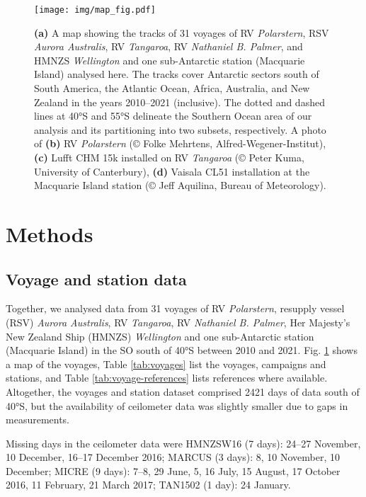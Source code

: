 \documentclass[12pt,a4paper]{article}
\begin{document}
\begin{figure}[b!]
\centering
\texttt{[image: img/map\_fig.pdf]}
\caption{
\textbf{(a)} A map showing the tracks of 31 voyages of RV \emph{Polarstern},
RSV \emph{Aurora Australis}, RV \emph{Tangaroa}, RV \emph{Nathaniel B. Palmer},
and HMNZS \emph{Wellington} and one sub-Antarctic station (Macquarie Island)
analysed here. The tracks cover Antarctic sectors south of South America, the
Atlantic Ocean, Africa, Australia, and New Zealand in the years 2010--2021
(inclusive).  The dotted and dashed lines at 40°S and 55°S delineate the
Southern Ocean area of our analysis and its partitioning into two subsets,
respectively.  A photo of \textbf{(b)} RV \emph{Polarstern} (© Folke Mehrtens,
Alfred-Wegener-Institut), \textbf{(c)} Lufft CHM 15k installed on RV
\emph{Tangaroa} (© Peter Kuma, University of Canterbury), \textbf{(d)} Vaisala
CL51 installation at the Macquarie Island station (© Jeff Aquilina, Bureau of
Meteorology).
}
\label{fig:map}
\end{figure}

\section{Methods}
\label{sec:methods}

\subsection{Voyage and station data}

Together, we analysed data from 31 voyages of RV \emph{Polarstern}, resupply
vessel (RSV) \emph{Aurora Australis}, RV \emph{Tangaroa}, RV \emph{Nathaniel B.
Palmer}, Her Majesty's New Zealand Ship (HMNZS) \emph{Wellington} and one
sub-Antarctic station (Macquarie Island) in the SO south of 40°S between 2010
and 2021. Fig. \ref{fig:map} shows a map of the voyages, Table
\ref{tab:voyages} list the voyages, campaigns and stations, and Table
\ref{tab:voyage-references} lists references where available. Altogether, the
voyages and station dataset comprised 2421 days of data south of 40°S, but the
availability of ceilometer data was slightly smaller due to gaps in
measurements.

Missing days in the ceilometer data were HMNZSW16 (7 days): 24--27 November, 10
December, 16--17 December 2016; MARCUS (3 days): 8, 10 November, 10 December;
MICRE (9 days): 7--8, 29 June, 5, 16 July, 15 August, 17 October 2016, 11
February, 21 March 2017; TAN1502 (1 day): 24 January.
\end{document}
